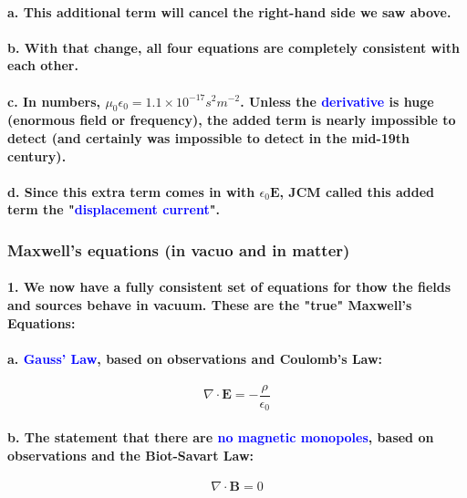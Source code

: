 \documentclass{article}
\begin{document}
\paragraph{\indent a. This additional term will cancel the right-hand side we saw above.}
\paragraph{\indent b. With that change, all four equations are completely consistent with each other.}
\paragraph{\indent c. In numbers, $\mu_0\epsilon_0=1.1\times 10^{-17}s^2m^{-2}$. Unless the \textcolor{blue}{derivative} is huge (enormous field or frequency), the added term is nearly impossible to detect (and certainly was impossible to detect in the mid-19th century).}
\paragraph{\indent d. Since this extra term comes in with $\epsilon_0\boldsymbol{E}$, JCM called this added term the "\textcolor{blue}{displacement current}".}
\subsubsection{Maxwell's equations (in vacuo and in matter)}
\paragraph{1. We now have a fully consistent set of equations for thow the fields and sources behave in vacuum. These are the "true" Maxwell's Equations:}
\paragraph{\indent a. \textcolor{blue}{Gauss' Law}, based on observations and Coulomb's Law:}
\begin{equation*}
    \nabla\cdot\boldsymbol{E}=-\frac{\rho}{\epsilon_0}
\end{equation*}
\paragraph{\indent b. The statement that there are \textcolor{blue}{no magnetic monopoles}, based on observations and the Biot-Savart Law:}
\begin{equation*}
    \nabla\cdot\boldsymbol{B}=0
\end{equation*}
\end{document}
